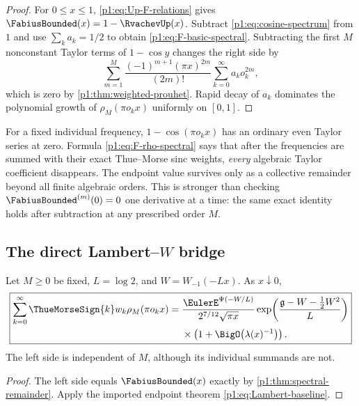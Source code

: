 \documentclass[11pt,oneside]{article}
\theoremstyle{definition}
\theoremstyle{remark}
\begin{document}
\begin{proof}
For $0\le x\le1$, \eqref{p1:eq:Up-F-relations} gives
$\FabiusBounded(x)=1-\RvachevUp(x)$.  Subtract \eqref{p1:eq:cosine-spectrum} from $1$ and use
$\sum_ka_k=1/2$ to obtain \eqref{p1:eq:F-basic-spectral}.  Subtracting the first
$M$ nonconstant Taylor terms of $1-\cos y$ changes the right side by
\[
 \sum_{m=1}^{M}\frac{(-1)^{m+1}(\pi x)^{2m}}{(2m)!}
 \sum_{k=0}^{\infty}a_ko_k^{2m},
\]
which is zero by \cref{p1:thm:weighted-prouhet}.  Rapid decay of $a_k$ dominates
the polynomial growth of $\rho_M(\pi o_kx)$ uniformly on $[0,1]$.
\end{proof}

\begin{remark}
For a fixed individual frequency, $1-\cos(\pi o_kx)$ has an ordinary even
Taylor series at zero.  Formula \eqref{p1:eq:F-rho-spectral} says that after the
frequencies are summed with their exact Thue--Morse sinc weights, \emph{every}
algebraic Taylor coefficient disappears.  The endpoint value survives only as
a collective remainder beyond all finite algebraic orders.  This is stronger
than checking $\FabiusBounded^{(m)}(0)=0$ one derivative at a time: the same exact identity
holds after subtraction at any prescribed order $M$.
\end{remark}

\subsection{The direct Lambert--\texorpdfstring{$W$}{W} bridge}

\begin{corollary}\label{p1:cor:Lambert-spectral-bridge}
Let $M\ge0$ be fixed, $L=\log2$, and
$W=W_{-1}(-Lx)$.  As $x\downarrow0$,
\begin{equation}\label{p1:eq:Lambert-spectral-bridge}
\boxed{
\begin{aligned}
 \sum_{k=0}^{\infty}\ThueMorseSign{k}w_k\rho_M(\pi o_kx)
 ={}&\frac{\EulerE^{\Psi(-W/L)}}{2^{7/12}\sqrt{\pi x}}
 \exp\!\left(\frac{\mathfrak g-W-\tfrac12W^2}{L}\right)\\
 &\times\left(1+\BigO\!\left(\lambda(x)^{-1}\right)\right).
\end{aligned}}
\end{equation}
The left side is independent of $M$, although its individual summands are not.
\end{corollary}

\begin{proof}
The left side equals $\FabiusBounded(x)$ exactly by
\cref{p1:thm:spectral-remainder}.  Apply the imported endpoint theorem
\eqref{p1:eq:Lambert-baseline}.
\end{proof}
\end{document}
